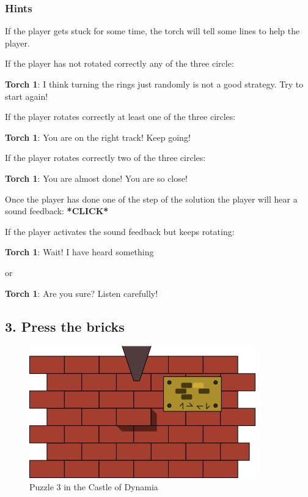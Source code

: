 \subsubsection*{Hints}
If the player gets stuck for some time, the torch will tell some lines to help the player.

If the player has not rotated correctly any of the three circle:

\textbf{Torch 1}: I think turning the rings just randomly is not a good strategy. Try to start again!

If the player rotates correctly at least one of the three circles:

\textbf{Torch 1}: You are on the right track! Keep going!

If the player rotates correctly two of the three circles:

\textbf{Torch 1}: You are almost done! You are so close!

Once the player has done one of the step of the solution the player will hear a sound feedback: \textbf{*CLICK*}

If the player activates the sound feedback but keeps rotating:

\textbf{Torch 1}: Wait! I have heard something

or

\textbf{Torch 1}: Are you sure? Listen carefully!


\subsection{3. Press the bricks}

\begin{figure}[H]
  \centering
  \includegraphics[width=\textwidth]{Images/Puzzles/castleOfDynamia3}
  \caption{Puzzle 3 in the Castle of Dynamia}
\end{figure}

